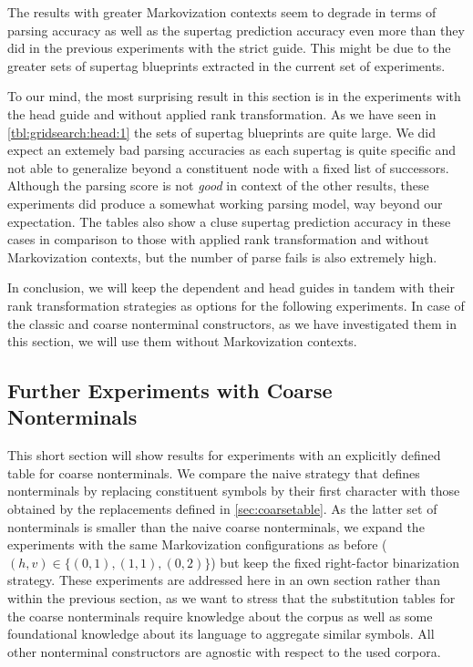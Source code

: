 \documentclass[../../document.tex]{subfiles}
\begin{document}
    The results with greater Markovization contexts seem to degrade in terms of parsing accuracy as well as the supertag prediction accuracy even more than they did in the previous experiments with the strict guide.
    This might be due to the greater sets of supertag blueprints extracted in the current set of experiments.

    To our mind, the most surprising result in this section is in the experiments with the head guide and without applied rank transformation.
    As we have seen in \cref{tbl:gridsearch:head:1} the sets of supertag blueprints are quite large.
    We did expect an extemely bad parsing accuracies as each supertag is quite specific and not able to generalize beyond a constituent node with a fixed list of successors.
    Although the parsing score is not \emph{good} in context of the other results, these experiments did produce a somewhat working parsing model, way beyond our expectation.
    The tables also show a cluse supertag prediction accuracy in these cases in comparison to those with applied rank transformation and without Markovization contexts, but the number of parse fails is also extremely high.

    In conclusion, we will keep the dependent and head guides in tandem with their rank transformation strategies as options for the following experiments.
    In case of the classic and coarse nonterminal constructors, as we have investigated them in this section, we will use them without Markovization contexts.

    \subsection{Further Experiments with Coarse Nonterminals}
    This short section will show results for experiments with an explicitly defined table for coarse nonterminals.
    We compare the naive strategy that defines nonterminals by replacing constituent symbols by their first character with those obtained by the replacements defined in \cref{sec:coarsetable}.
    As the latter set of nonterminals is smaller than the naive coarse nonterminals, we expand the experiments with the same Markovization configurations as before ($(h,v) \in \{(0,1), (1,1), (0,2)\}$) but keep the fixed right-factor binarization strategy.
    These experiments are addressed here in an own section rather than within the previous section, as we want to stress that the substitution tables for the coarse nonterminals require knowledge about the corpus as well as some foundational knowledge about its language to aggregate similar symbols.
    All other nonterminal constructors are agnostic with respect to the used corpora.
\end{document}
